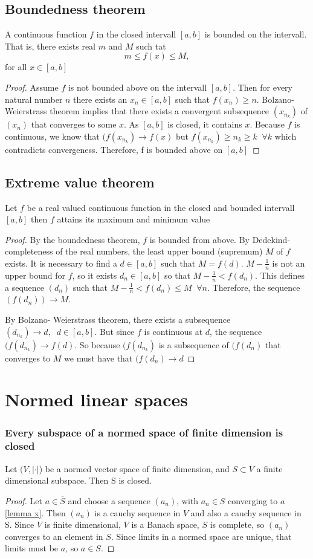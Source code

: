 \documentclass[titlepage]{article}
\begin{document}
\subsection{Boundedness theorem}
A continuous function $f$ in the closed intervall $[a,b]$ is bounded on the intervall. That is, there exists real $m$ and $M$ such tat $$m\leq f(x) \leq M, $$ for all $x\in [a,b]$
\begin{proof}
Assume $f$ is not bounded above on the intervall $[a,b]$. Then for every natural number $n$ there exists an $x_n \in [a,b]$ such that $f(x_n)\geq n$. Bolzano- Weierstrass theorem implies that there exists a convergent subsequence $(x_{n_k})$ of $(x_n)$ that converges to some $x$. As $[a,b]$ is closed, it contains $x$. Because $f$ is continuous, we know that $(f(x_{n_k}) \rightarrow f(x)$ but $f(x_{n_k}) \geq n_k \geq k \;\; \forall k$ which contradicts convergeness. Therefore, f is bounded above on $[a,b]$ 
\end{proof}
\subsection{Extreme value theorem}
Let $f$ be a real valued continuous function in the closed and bounded intervall $[a,b]$ then $f$ attains its maximum and minimum value
\begin{proof}
By the boundedness theorem, $f$ is bounded from above. By Dedekind-completeness of the real numbers, the least upper bound (supremum) $M$ of $f$ exists. It is necessary to find a $d\in[a,b]$ such that $M = f(d)$. $M-\frac{1}{n}$ is not an upper bound for $f$, so it exists $d_n \in [a,b]$ so that $M-\frac{1}{n} < f(d_n)$. This defines a sequence $(d_n)$ such that $M-\frac{1}{n} < f(d_n) \leq M \;\; \forall n$. Therefore, the sequence $(f(d_n)) \rightarrow M$.

By Bolzano- Weierstrass theorem, there exists a subsequence $(d_{n_k}) \rightarrow d, \;\;d \in [a,b]$. But since $f$ is continuous at $d$, the sequence $(f(d_{n_k}) \rightarrow f(d)$. So because $(f(d_{n_k})$ is a subsequence of $(f(d_{n})$ that converges to $M$ we must have that $(f(d_{n}) \rightarrow d$
\end{proof}


\section{Normed linear spaces}
\subsubsection{Every subspace of a normed space of finite dimension is closed}
Let $(V, |\cdot|$) be a normed vector space of finite dimension, and $S\subset V$ a finite dimensional subspace. Then S is closed.
\begin{proof}
Let $a\in \overline{S}$ and choose a sequence $(a_n)$, with $a_n \in S$ converging to $a$ \ref{lemma x}. Then $(a_n)$ is a cauchy sequence in $V$ and also a cauchy sequence in S. Since $V$ is finite dimensional, $V$ is a Banach space, $S$ is complete, so $(a_n)$ converges to an element in $S$. Since limits in a normed space are unique, that limits must be $a$, so $a\in S$.
\end{proof}
\end{document}
